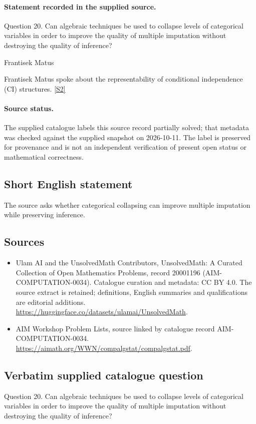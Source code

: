 \documentclass[11pt]{article}
\begin{document}
\paragraph{Statement recorded in the supplied source.}
Question 20. Can algebraic techniques be used to collapse levels of categorical variables in order to improve the quality of multiple imputation without destroying the quality of inference?

Frantisek Matus

Frantisek Matus spoke about the representability of conditional independence (CI) structures. \href{https://aimath.org/WWN/compalgstat/compalgstat.pdf}{[S2]}
\paragraph{Source status.}
The supplied catalogue labels this source record partially solved; that metadata was checked against the supplied snapshot on 2026-10-11. The label is preserved for provenance and is not an independent verification of present open status or mathematical correctness.
\subsection{Short English statement}
The source asks whether categorical collapsing can improve multiple imputation while preserving inference.
\subsection{Sources}
\begin{itemize}
\item[S1] Ulam AI and the UnsolvedMath Contributors, UnsolvedMath: A Curated Collection of Open Mathematics Problems, record 20001196 (AIM-COMPUTATION-0034). Catalogue curation and metadata: CC BY 4.0. The source extract is retained; definitions, English summaries and qualifications are editorial additions.
\url{https://huggingface.co/datasets/ulamai/UnsolvedMath}.
\item[S2] AIM Workshop Problem Lists, source linked by catalogue record AIM-COMPUTATION-0034.
\url{https://aimath.org/WWN/compalgstat/compalgstat.pdf}.
\end{itemize}
\subsection{Verbatim supplied catalogue question}
Question 20. Can algebraic techniques be used to collapse levels of categorical variables in order to improve the quality of multiple imputation without destroying the quality of inference?
\end{document}
